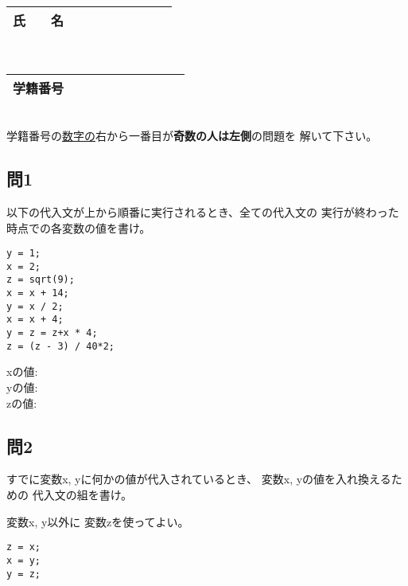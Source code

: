 \documentclass[a4j]{jarticle}
\def\ds{\displaystyle}
\begin{document}
\thispagestyle{empty}

\begin{multicols*}{2}%


\def\subst#1#2{$\ds #1$
 \ $\longrightarrow$\ 
 \underline{\hbox to 5cm{\ttfamily #2}}}



\noindent
\begin{tabular}[t]{|c|cccccccc|}\hline
氏　　名 & & & & & & & & \\ \hline
\end{tabular}\\
\begin{tabular}[t]{|c|c|c|c|c|c|c|c|c|c|}\hline
学籍番号 & & & & & & & & \\ \hline
\end{tabular}\\
学籍番号の\underline{数字の}右から一番目が{\bfseries 奇数の人は左側}の問題を
解いて下さい。
\vspace{-5ex}


\subsection*{問1}

以下の代入文が上から順番に実行されるとき、全ての代入文の
実行が終わった時点での各変数の値を書け。

\begin{verbatim}
y = 1;
x = 2;
z = sqrt(9);
x = x + 14;
y = x / 2;
x = x + 4;
y = z = z+x * 4;
z = (z - 3) / 40*2;
\end{verbatim}


{\ttfamily x}の値:\\

{\ttfamily y}の値:\\

{\ttfamily z}の値:\\


\subsection*{問2}

すでに変数{\ttfamily x, y}に何かの値が代入されているとき、
変数{\ttfamily x, y}の値を入れ換えるための
代入文の組を書け。

変数{\ttfamily x, y}以外に
変数{\ttfamily z}を使ってよい。

\ifnum {}
\vspace*{3cm}
\else
\begin{verbatim}
z = x;
x = y;
y = z;
\end{verbatim}\vspace*{1cm}
\fi




\end{multicols*}
\end{document}
